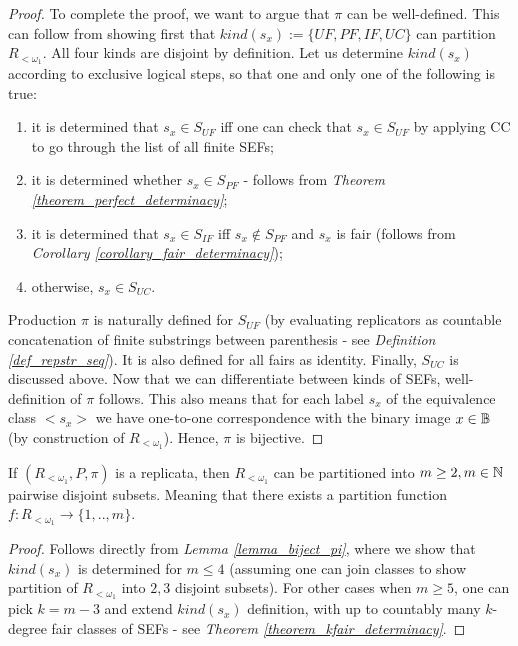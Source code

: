 \begin{proof}
  To complete the proof, we want to argue that $\pi$ can be well-defined. This can follow from showing first that $kind(s_x) := \{UF, PF, IF, UC\}$ can partition $R_{<\omega_1}$. All four kinds are disjoint by definition. Let us determine $kind(s_x)$ according to exclusive logical steps, so that one and only one of the following is true:
  \begin{enumerate}
    \item it is determined that $s_x \in S_{UF}$ iff one can check that $s_x \in S_{UF}$ by applying CC to go through the list of all finite SEFs;
    \item it is determined whether $s_x \in S_{PF}$ - follows from \textit{Theorem \ref{theorem_perfect_determinacy}};
    \item it is determined that $s_x \in S_{IF}$ iff $s_x \notin S_{PF}$ and $s_x$ is fair (follows from \textit{Corollary \ref{corollary_fair_determinacy}});
    \item otherwise, $s_x \in S_{UC}$.
  \end{enumerate}
  Production $\pi$ is naturally defined for $S_{UF}$ (by evaluating replicators as countable concatenation of finite substrings between parenthesis - see \textit{Definition \ref{def_repstr_seq}}). It is also defined for all fairs as identity. Finally, $S_{UC}$ is discussed above. Now that we can differentiate between kinds of SEFs, well-definition of $\pi$ follows. This also means that for each label $s_x$ of the equivalence class $<s_x>$ we have one-to-one correspondence with the binary image $x \in \mathbb{B}$ (by construction of $R_{<\omega_1}$). Hence, $\pi$ is bijective.
\end{proof}

\begin{lemma}\label{lemma_part_replicata}
  If $(R_{<\omega_1}, P, \pi)$ is a replicata, then $R_{<\omega_1}$ can be partitioned into $m \geq 2, m \in \mathbb{N}$ pairwise disjoint subsets. Meaning that there exists a partition function $f: R_{<\omega_1} \to \{1, .., m\}$.
\end{lemma}
\begin{proof}
  Follows directly from \textit{Lemma \ref{lemma_biject_pi}}, where we show that $kind(s_x)$ is determined for $m \leq 4$ (assuming one can join classes to show partition of $R_{<\omega_1}$ into ${2, 3}$ disjoint subsets). For other cases when $m \geq 5$, one can pick $k = m - 3$ and extend $kind(s_x)$ definition, with up to countably many $k$-degree fair classes of SEFs - see \textit{Theorem \ref{theorem_kfair_determinacy}}.  
\end{proof}

